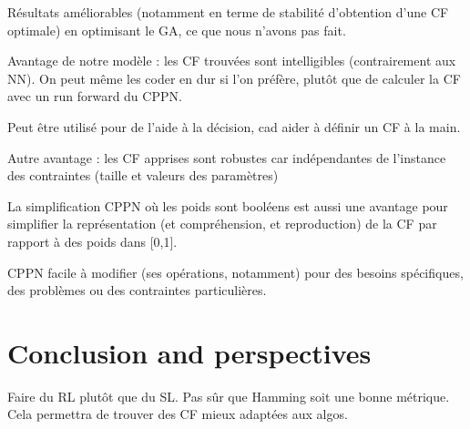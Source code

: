 \documentclass{article}
\begin{document}
Résultats améliorables  (notamment en  terme de  stabilité d'obtention
d'une CF optimale) en optimisant le GA, ce que nous n'avons pas fait.

Avantage  de  notre  modèle  :  les  CF  trouvées  sont  intelligibles
(contrairement aux NN). On peut même les coder en dur si l'on préfère,
plutôt que de calculer la CF avec un run forward du CPPN.

Peut être utilisé pour de l'aide à la décision, cad aider à définir un
CF à la main.

Autre avantage  : les CF  apprises sont robustes car  indépendantes de
l'instance des contraintes (taille et valeurs des paramètres)

La  simplification CPPN  où  les  poids sont  booléens  est aussi  une
avantage  pour  simplifier  la représentation  (et  compréhension,  et
reproduction) de la CF par rapport à des poids dans [0,1].

CPPN facile  à modifier (ses  opérations, notamment) pour  des besoins
spécifiques, des problèmes ou des contraintes particulières.


\section{Conclusion and perspectives}\label{sec:conclusion}

Faire du  RL plutôt  que du  SL. Pas  sûr que  Hamming soit  une bonne
métrique. Cela permettra de trouver des CF mieux adaptées aux algos.




\end{document}
